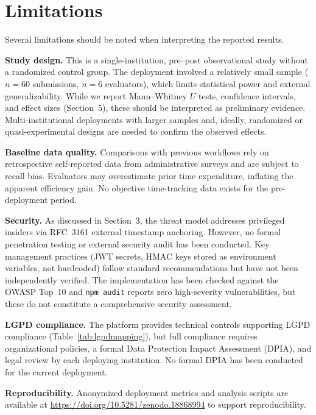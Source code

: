 \documentclass[preprint,12pt,a4paper]{elsarticle}
\begin{document}
\section{Limitations}

Several limitations should be noted when interpreting the reported results.

\textbf{Study design.} This is a single-institution, pre--post observational study without a randomized control group. The deployment involved a relatively small sample ($n = 60$ submissions, $n = 6$ evaluators), which limits statistical power and external generalizability. While we report Mann--Whitney $U$ tests, confidence intervals, and effect sizes (Section~5), these should be interpreted as preliminary evidence. Multi-institutional deployments with larger samples and, ideally, randomized or quasi-experimental designs are needed to confirm the observed effects.

\textbf{Baseline data quality.} Comparisons with previous workflows rely on retrospective self-reported data from administrative surveys and are subject to recall bias. Evaluators may overestimate prior time expenditure, inflating the apparent efficiency gain. No objective time-tracking data exists for the pre-deployment period.

\textbf{Security.} As discussed in Section~3, the threat model addresses privileged insiders via RFC~3161 external timestamp anchoring. However, no formal penetration testing or external security audit has been conducted. Key management practices (JWT secrets, HMAC keys stored as environment variables, not hardcoded) follow standard recommendations but have not been independently verified. The implementation has been checked against the OWASP Top~10 \citep{Owasp2023} and \texttt{npm audit} reports zero high-severity vulnerabilities, but these do not constitute a comprehensive security assessment.

\textbf{LGPD compliance.} The platform provides technical controls supporting LGPD compliance (Table~\ref{tab:lgpdmapping}), but full compliance requires organizational policies, a formal Data Protection Impact Assessment (DPIA), and legal review by each deploying institution. No formal DPIA has been conducted for the current deployment.

\textbf{Reproducibility.} Anonymized deployment metrics and analysis scripts are available at \url{https://doi.org/10.5281/zenodo.18868994} to support reproducibility.
\end{document}
